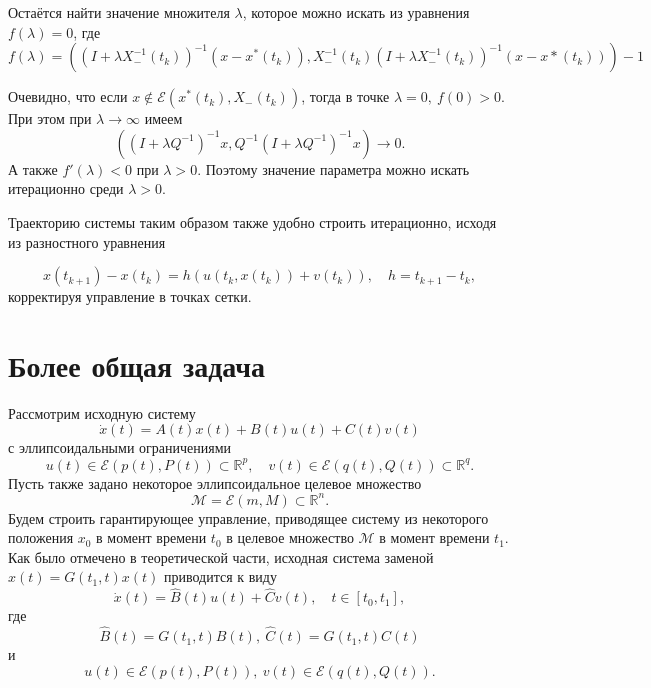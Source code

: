 Остаётся найти значение множителя \( \lambda \), которое можно искать из уравнения \( f(\lambda) = 0 \), где
\begin{equation*}
    f(\lambda) = ((I + \lambda X_-^{-1}(t_k))^{-1}(x - x^*(t_k)), X_-^{-1}(t_k)(I + \lambda X_-^{-1}(t_k))^{-1}(x - x*(t_k))) - 1
\end{equation*}

Очевидно, что если \( x \notin \mathcal{E}(x^*(t_k), X_-(t_k)) \), тогда в точке \( \lambda = 0, \ f(0) > 0 \).
При этом при \( \lambda \to \infty \) имеем
\begin{equation*}
    ((I + \lambda Q^{-1})^{-1}x, Q^{-1}(I + \lambda Q^{-1})^{-1}x ) \to 0.
\end{equation*}
А также \( f'(\lambda) < 0 \) при  \( \lambda > 0. \) Поэтому значение параметра можно искать итерационно среди 
 \( \lambda > 0 \). 

Траекторию системы таким образом также удобно строить итерационно, исходя из разностного уравнения

\begin{equation*}
    x(t_{k+1}) - x(t_k) = h(u(t_k, x(t_k)) + v(t_k)), \quad h = t_{k+1} - t_k,
\end{equation*}
корректируя управление в точках сетки.

\section{Более общая задача}

Рассмотрим исходную систему
\begin{equation*}
    \dot{x}(t) = A(t) x(t) + B(t) u(t) + C(t) v(t)
\end{equation*}
с эллипсоидальными ограничениями
\begin{equation*}
    u(t) \in \mathcal{E}(p(t), P(t)) \subset \mathbb{R}^p, \quad v(t) \in \mathcal{E}(q(t), Q(t)) \subset \mathbb{R}^q.
\end{equation*}
Пусть также задано некоторое эллипсоидальное целевое множество
\begin{equation*}
    \mathcal{M} = \mathcal{E}(m, M) \subset \mathbb{R}^n.
\end{equation*}
Будем строить гарантирующее управление, приводящее систему из некоторого положения 
\( x_0 \) в момент времени \( t_0 \) в целевое множество \( \mathcal{M} \) в момент времени \( t_1 \). Как было отмечено в теоретической части,
 исходная система заменой \( x(t) = G(t_1, t) x(t) \) приводится к виду
\begin{equation*}
    \dot{x}(t) = \hat{B}(t)u(t) + \hat{C}v(t), \quad t \in [t_0, t_1],
\end{equation*}
где 
\begin{equation*}
    \hat{B}(t) = G(t_1, t)B(t), \ \hat{C}(t) = G(t_1, t) C(t)
\end{equation*}
и
\begin{equation*}
    u(t) \in \mathcal{E}(p(t), P(t)), \ v(t) \in \mathcal{E}(q(t), Q(t)).
\end{equation*}

